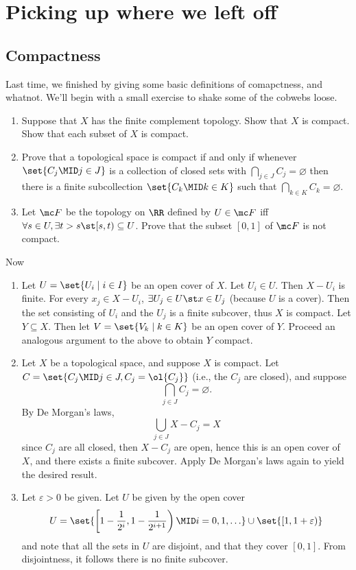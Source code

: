 \documentclass{fkbook}
\theoremstyle{snazzydefinition}
\begin{document}
\section{Picking up where we left off}
\begin{adjustwidth}{1em}{1em}
  \subsection{Compactness}
  Last time, we finished by giving some basic definitions of
  comapctness, and whatnot. We'll begin with a small exercise to shake
  some of the cobwebs loose.
  \begin{enumerate}
    \item Suppose that $X$ has the finite complement topology. Show
      that $X$ is compact. Show that each subset of $X$ is compact.
    \item Prove that a topological space is compact if and only if
      whenever $\set{C_j \MID j \in J}$ is a collection of closed sets
      with $\bigcap_{j\in J} C_j = \varnothing$ then there is a finite
      subcollection $\set{C_k \MID k \in K}$ such that $\bigcap_{k \in
        K} C_k = \varnothing$.
    \item Let $\mc F$ be the topology on $\RR$ defined by $U \in \mc
      F$ iff $\forall s \in U, \exists t > s \st [s,t) \subseteq U$.
      Prove that the subset $[0,1]$ of $\mc F$ is not compact.
  \end{enumerate}
  Now
  \begin{enumerate}
    \item Let $U = \set{U_i \mid i \in I}$ be an open cover of $X$.
      Let $U_i \in U$. Then $X - U_i$ is finite. For every $x_j \in X
      - U_i$, $\exists U_j \in U \st x \in U_j$ (because $U$ is a
      cover). Then the set consisting of $U_i$ and the $U_j$ is a
      finite subcover, thus $X$ is compact. Let $Y \subseteq X$. Then
      let $V = \set{V_k \mid k \in K}$ be an open cover of $Y$.
      Proceed an analogous argument to the above to obtain $Y$
      compact.
    \item Let $X$ be a topological space, and suppose $X$ is compact.
      Let $C = \set{C_j \MID j \in J, C_j = \ol{C_j}}$ (i.e., the
      $C_j$ are closed), and suppose
      \[
        \bigcap_{j \in J} C_j = \varnothing.
      \]
      By De Morgan's laws,
      \[
        \bigcup_{j \in J} X - C_j = X
      \]
      since $C_j$ are all closed, then $X - C_j$ are open, hence this
      is an open cover of $X$, and there exists a finite subcover.
      Apply De Morgan's laws again to yield the desired result.
    \item Let $\varepsilon > 0$ be given. Let $U$ be given by the open
      cover
      \[
        U = %
          \set{ \left[ 1 - \frac{1}{2^i}, 1 - \frac{1}{2^{i +
                1}}\right) \MID i = 0, 1, \ldots }%
      \cup %
        \set{\left[1, 1 + \varepsilon \right)}%
      \]
      and note that all the sets in $U$ are disjoint, and that they
      cover $[0,1]$. From disjointness, it follows there is no finite
      subcover.
  \end{enumerate}

\end{adjustwidth}
\end{document}
